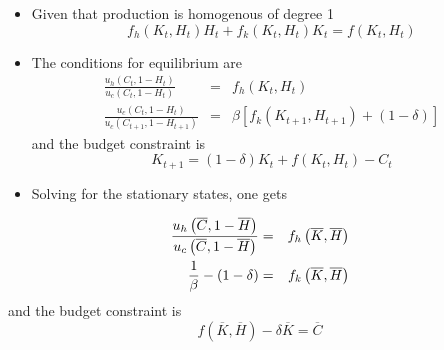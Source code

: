 \documentclass[notes=show]{beamer}
\begin{document}
\begin{frame}%


\begin{itemize}
\item Given that production is homogenous of degree 1 
\[
f_{h}\left( K_{t},H_{t}\right) H_{t}+f_{k}\left( K_{t},H_{t}\right)
K_{t}=f\left( K_{t},H_{t}\right) 
\]

\item The conditions for equilibrium are%
\begin{eqnarray*}
\frac{u_{h}\left( C_{t},1-H_{t}\right) }{u_{c}\left( C_{t},1-H_{t}\right) }
&=&f_{h}\left( K_{t},H_{t}\right) \\
\frac{u_{c}\left( C_{t},1-H_{t}\right) }{u_{c}\left(
C_{t+1},1-H_{t+1}\right) } &=&\beta \left[ f_{k}\left(
K_{t+1},H_{t+1}\right) +\left( 1-\delta \right) \right]
\end{eqnarray*}%
and the budget constraint is 
\[
K_{t+1}=\left( 1-\delta \right) K_{t}+f\left( K_{t},H_{t}\right) -C_{t} 
\]
\end{itemize}

\end{frame}%

\begin{frame}%


\begin{itemize}
\item Solving for the stationary states, one gets
\end{itemize}

\begin{eqnarray*}
\frac{u_{h}\left( \overline{C},1-\overline{H}\right) }{u_{c}\left( \overline{%
C},1-\overline{H}\right) } &=&f_{h}\left( \overline{K},\overline{H}\right) \\
\frac{1}{\beta }-\left( 1-\delta \right) &=&f_{k}\left( \overline{K},%
\overline{H}\right)
\end{eqnarray*}%
and the budget constraint is 
\[
f\left( \overline{K},\overline{H}\right) -\delta \overline{K}=\overline{C} 
\]

\end{frame}%
\end{document}
